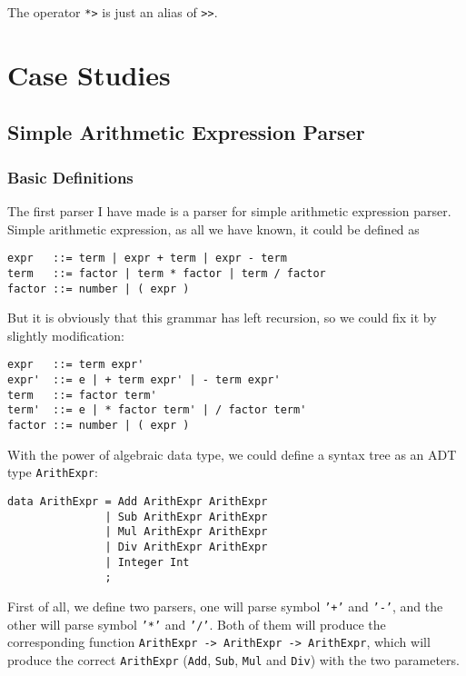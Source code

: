 The operator \texttt{*>} is just an alias of \texttt{>>}.

\section{Case Studies}
\subsection{Simple Arithmetic Expression Parser}

\subsubsection{Basic Definitions}

The first parser I have made is a parser for simple arithmetic expression parser. Simple arithmetic expression, as all we have known, it could be defined as

\begin{lstlisting}[language={}]
expr   ::= term | expr + term | expr - term
term   ::= factor | term * factor | term / factor
factor ::= number | ( expr )
\end{lstlisting}

But it is obviously that this grammar has left recursion, so we could fix it by slightly modification:

\begin{lstlisting}[language={}]
expr   ::= term expr'
expr'  ::= e | + term expr' | - term expr'
term   ::= factor term'
term'  ::= e | * factor term' | / factor term'
factor ::= number | ( expr )
\end{lstlisting}

With the power of algebraic data type, we could define a syntax tree as an ADT type \texttt{ArithExpr}:

\begin{lstlisting}
data ArithExpr = Add ArithExpr ArithExpr
               | Sub ArithExpr ArithExpr
               | Mul ArithExpr ArithExpr
               | Div ArithExpr ArithExpr
               | Integer Int
               ;
\end{lstlisting}

First of all, we define two parsers, one will parse symbol \texttt{'+'} and \texttt{'-'}, and the other will parse symbol \texttt{'*'} and \texttt{'/'}. Both of them will produce the corresponding function \texttt{ArithExpr -> ArithExpr -> ArithExpr}, which will produce the correct \texttt{ArithExpr} (\texttt{Add}, \texttt{Sub}, \texttt{Mul} and \texttt{Div}) with the two parameters.

